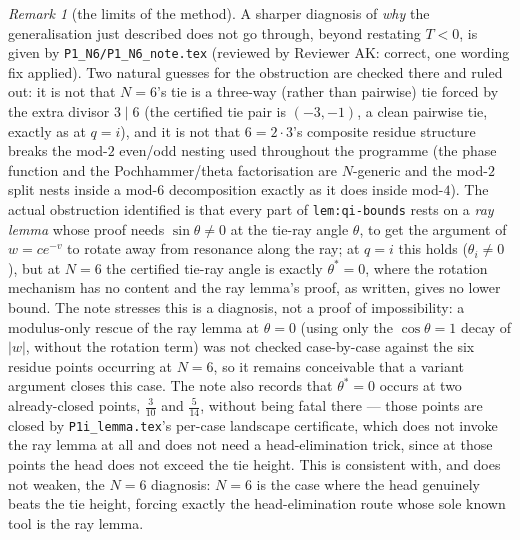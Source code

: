 \documentclass[11pt]{article}
\theoremstyle{plain}
\theoremstyle{definition}
\theoremstyle{remark}
\newtheorem{remark}[theorem]{Remark}
\theoremstyle{plain}\newtheorem*{maintheorem}{Main Theorem}
\begin{document}
\begin{remark}[the limits of the method]
A sharper diagnosis of \emph{why} the generalisation just described does not go through, beyond
restating $T<0$, is given by \texttt{P1\_N6/P1\_N6\_note.tex} (reviewed by Reviewer AK: correct, one
wording fix applied). Two natural guesses for the obstruction are checked there and ruled out: it is not
that $N=6$'s tie is a three-way (rather than pairwise) tie forced by the extra divisor $3\mid6$ (the
certified tie pair is $(-3,-1)$, a clean pairwise tie, exactly as at $q=i$), and it is not that
$6=2\cdot3$'s composite residue structure breaks the mod-$2$ even/odd nesting used throughout the
programme (the phase function and the Pochhammer/theta factorisation are $N$-generic and the mod-$2$
split nests inside a mod-$6$ decomposition exactly as it does inside mod-$4$). The actual obstruction
identified is that every part of \texttt{lem:qi-bounds} rests on a \emph{ray lemma} whose proof needs
$\sin\theta\ne0$ at the tie-ray angle $\theta$, to get the argument of $w=ce^{-v}$ to rotate away from
resonance along the ray; at $q=i$ this holds ($\theta_i\ne0$), but at $N=6$ the certified tie-ray angle is
exactly $\theta^\ast=0$, where the rotation mechanism has no content and the ray lemma's proof, as
written, gives no lower bound. The note stresses this is a diagnosis, not a proof of impossibility: a
modulus-only rescue of the ray lemma at $\theta=0$ (using only the $\cos\theta=1$ decay of $|w|$, without
the rotation term) was not checked case-by-case against the six residue points occurring at $N=6$, so it
remains conceivable that a variant argument closes this case. The note also records that $\theta^\ast=0$
occurs at two already-closed points, $\frac3{10}$ and $\frac5{14}$, without being fatal there --- those
points are closed by \texttt{P1i\_lemma.tex}'s per-case landscape certificate, which does not invoke the
ray lemma at all and does not need a head-elimination trick, since at those points the head does not
exceed the tie height. This is consistent with, and does not weaken, the $N=6$ diagnosis: $N=6$ is the
case where the head genuinely beats the tie height, forcing exactly the head-elimination route whose sole
known tool is the ray lemma.


\end{remark}
\end{document}
